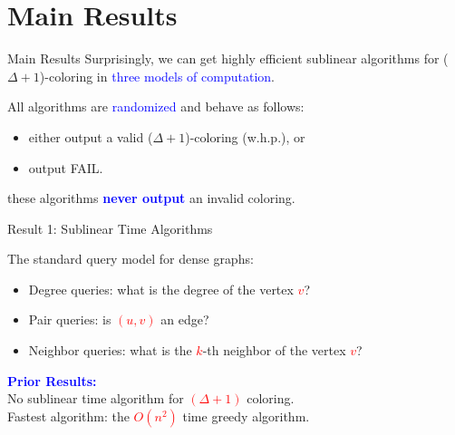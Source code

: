 \documentclass[aspectratio=169,xcolor=dvipsnames]{beamer}
\begin{document}
	\section{Main Results}
	
	\begin{frame}{Main Results}
		Surprisingly, we can get highly efficient sublinear algorithms for
		\alert{(\(\Delta + 1\))}-coloring in
		\textcolor{blue}{three models of computation}.
		
		\vspace{1em}
		All algorithms are \textcolor{blue}{randomized} and behave as follows:
		\begin{itemize}
			\item either output a valid \alert{(\(\Delta + 1\))}-coloring (w.h.p.), or
			\item output FAIL.
		\end{itemize}
		
		\vspace{1em}
		these algorithms \textcolor{blue}{\textbf{never output}} an invalid coloring.
	\end{frame}
	
	\begin{frame}{Result 1: Sublinear Time Algorithms}
		
		The standard query model for dense graphs:
		\begin{itemize}
			\item Degree queries: what is the degree of the vertex \textcolor{red}{$v$}?
			\item Pair queries: is \textcolor{red}{$(u, v)$} an edge?
			\item Neighbor queries: what is the \textcolor{red}{$k$}-th neighbor of the vertex \textcolor{red}{$v$}?
		\end{itemize}
		
		\vspace{1em}
		\textcolor{blue}{\textbf{Prior Results:}} \\
		No sublinear time algorithm for \textcolor{red}{$(\Delta + 1)$} coloring. \\
		Fastest algorithm: the \textcolor{red}{$O(n^2)$} time greedy algorithm.
		
	\end{frame}
	
\end{document}
